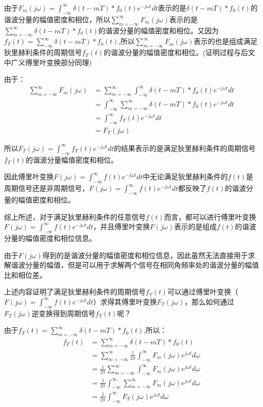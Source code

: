 \documentclass{article}
\numberwithin{equation}{section}
\numberwithin{figure}{section}
\begin{document}
由于$F_m(j\omega)=\int_{-\infty}^{\infty}\delta(t-mT)*f_0(t)e^{-j\omega t}dt$表示的是$\delta(t-mT)*f_0(t)$的谐波分量的幅值密度和相位，所以$\sum_{m=-\infty}^{\infty}F_m(j\omega)$表示的是$\sum_{m=-\infty}^{\infty}\delta(t-mT)*f_0(t)$的谐波分量的幅值密度和相位。又因为$f_T(t)=\sum_{-\infty}^{\infty}\delta(t-mT)*f_0(t)$,所以$\sum_{m=-\infty}^{\infty}F_m(j\omega)$表示的也是组成满足狄里赫利条件的周期信号$f_T(t)$的谐波分量的幅值密度和相位。(证明过程与后文中广义傅里叶变换部分同理)

由于：
\begin{equation}
    \begin{split}
        \sum_{m=-\infty}^{\infty}F_m(j\omega)&=\sum_{m=-\infty}^{\infty}\int_{-\infty}^{\infty}\delta(t-mT)*f_0(t)e^{-j\omega t}dt\\
        &=\int_{-\infty}^{\infty}\sum_{m=-\infty}^{\infty}\delta(t-mT)*f_0(t)e^{-j\omega t}dt\\
        &=\int_{-\infty}^{\infty}f_T(t)e^{-j\omega t}dt\\
        &=F_T(j\omega)
    \end{split}
\end{equation}

所以$F_T(j\omega)=\int_{-\infty}^{\infty}f_T(t)e^{-j\omega t}dt$的结果表示的是满足狄里赫利条件的周期信号$f_T(t)$的谐波分量幅值密度和相位。

因此傅里叶变换$F(j\omega)=\int_{-\infty}^{\infty}f(t)e^{-j\omega t}dt$中无论满足狄里赫利条件的$f(t)$是周期信号还是非周期信号，$F(j\omega)=\int_{-\infty}^{\infty}f(t)e^{-j\omega t}dt$都反映了$f(t)$的谐波分量的幅值密度和相位。

综上所述，对于满足狄里赫利条件的任意信号$f(t)$而言，都可以进行傅里叶变换$F(j\omega)=\int_{-\infty}^{\infty}f(t)e^{-j\omega t}dt$，并且傅里叶变换$F(j\omega)$表示的是组成$f(t)$的谐波分量的幅值密度和相位信息。

由于$F(j\omega)$得到的是谐波分量的幅值密度和相位信息，因此虽然无法直接用于求解谐波分量的幅值，但是可以用于求解两个信号在相同角频率处的谐波分量的幅值比和相位差。

上述内容证明了满足狄里赫利条件的周期信号$f_T(t)$可以通过傅里叶变换（$F(j\omega)=\int_{-\infty}^{\infty}f(t)e^{-j\omega t}dt$）求得其傅里叶变换$F_T(j\omega)$，那么如何通过$F_T(j\omega)$逆变换得到周期信号$f_T(t)$呢？

由于$f_T(t)=\sum_{m=-\infty}^{\infty}\delta(t-mT)*f_0(t)$,所以：
\begin{equation}
    \begin{split}
        f_T(t)&=\sum_{m=-\infty}^{\infty}\delta(t-mT)*f_0(t)\\
        &=\sum_{m=-\infty}^{\infty}\frac{1}{2\pi}\int_{-\infty}^{\infty}F_m(j\omega)e^{j\omega t}d\omega\\
        &=\frac{1}{2\pi}\sum_{m=-\infty}^{\infty}\int_{-\infty}^{\infty}F_m(j\omega)e^{j\omega t}d\omega\\
        &=\frac{1}{2\pi}\int_{-\infty}^{\infty}\sum_{m=-\infty}^{\infty}F_m(j\omega)e^{j\omega t}d\omega\\
        &=\frac{1}{2\pi}\int_{-\infty}^{\infty}F_T(j\omega)e^{j\omega t}d\omega
    \end{split}
\end{equation}
\end{document}
